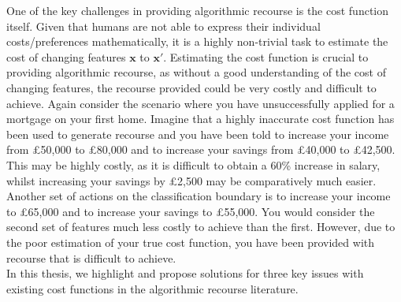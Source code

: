 One of the key challenges in providing algorithmic recourse is the cost function itself. Given that humans are not able to express their individual costs/preferences mathematically, it is a highly non-trivial task to estimate the cost of changing features $\mathbf{x}$ to  $\mathbf{x}'$. Estimating the cost function is crucial to providing algorithmic recourse, as without a good understanding of the cost of changing features, the recourse provided could be very costly and difficult to achieve. Again consider the scenario where you have unsuccessfully applied for a mortgage on your first home. Imagine that a highly inaccurate cost function has been used to generate recourse and you have been told to increase your income from £50,000 to £80,000 and to increase your savings from £40,000 to £42,500. This may be highly costly, as it is difficult to obtain a 60\% increase in salary, whilst increasing your savings by £2,500 may be comparatively much easier. Another set of actions on the classification boundary is to increase your income to £65,000 and to increase your savings to £55,000. You would consider the second set of features much less costly to achieve than the first. However, due to the poor estimation of your true cost function, you have been provided with recourse that is difficult to achieve.\\

In this thesis, we highlight and propose solutions for three key issues with existing cost functions in the algorithmic recourse literature.


